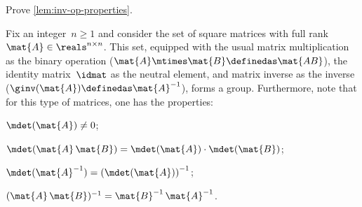 \begin{gradedexercise}
    \label{ex:GroupInverseProperties}
    Prove \cref{lem:inv-op-properties}.
\end{gradedexercise}


\begin{example}
    \label{exa:square-full}
    Fix an integer~$n\geq1 $ and consider the set of square matrices with full rank~$\mat{A} \in \reals^{n\times n}$.
    This set, equipped with the usual matrix multiplication as the binary operation ($\mat{A}\mtimes \mat{B}\definedas \mat{AB}$), the identity matrix~$\idmat$ as the neutral element, and matrix inverse as the inverse ($\ginv(\mat{A})\definedas \mat{A}^{-1}$), forms a group.
    Furthermore, note that for this type of matrices, one has the properties:
    \begin{compactenum}
        \item $\mdet(\mat{A}) \neq 0$;
        \item $\mdet(\mat{A} \, \mat{B}) = \mdet(\mat{A}) \cdot  \mdet(\mat{B})$;
        \item $\mdet(\mat{A}^{-1}) = \left( \mdet(\mat{A}) \right) ^ {-1}$;
        \item $(\mat{A}\,\mat{B})^{-1} = {\mat{B}^{-1} \, \mat{A}^{-1}}$.
    \end{compactenum}
\end{example}

